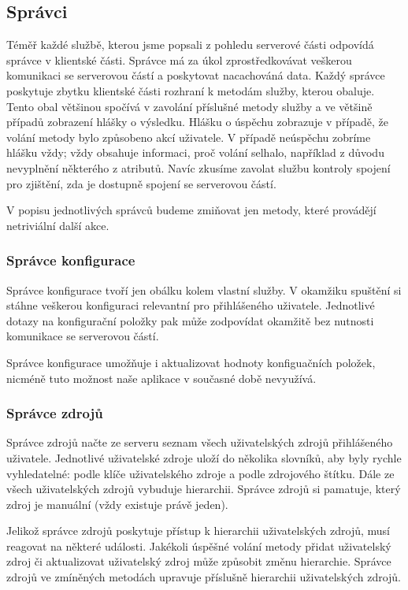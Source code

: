 \subsection{Správci}

Téměř každé službě, kterou jsme popsali z pohledu serverové části odpovídá správce v klientské části.
Správce má za úkol zprostředkovávat veškerou komunikaci se serverovou částí a poskytovat nacachováná data.
Každý správce poskytuje zbytku klientské části rozhraní k metodám služby, kterou obaluje.
Tento obal většinou spočívá v zavolání příslušné metody služby a ve většině případů zobrazení hlášky o výsledku.
Hlášku o úspěchu zobrazuje v případě, že volání metody bylo způsobeno akcí uživatele.
V případě neúspěchu zobríme hlášku vždy; vždy obsahuje informaci, proč volání selhalo, například z důvodu nevyplnění některého z atributů.
Navíc zkusíme zavolat službu kontroly spojení pro zjištění, zda je dostupně spojení se serverovou částí.

V popisu jednotlivých správců budeme zmiňovat jen metody, které provádějí netriviální další akce.

\subsubsection{Správce konfigurace}

Správce konfigurace tvoří jen obálku kolem vlastní služby.
V okamžiku spuštění si stáhne veškerou konfiguraci relevantní pro přihlášeného uživatele.
Jednotlivé dotazy na konfigurační položky pak může zodpovídat okamžitě bez nutnosti komunikace se serverovou částí.

Správce konfigurace umožňuje i aktualizovat hodnoty konfiguačních položek, nicméně tuto možnost naše aplikace v současné době nevyužívá.

\subsubsection{Správce zdrojů}

Správce zdrojů načte ze serveru seznam všech uživatelských zdrojů přihlášeného uživatele.
Jednotlivé uživatelské zdroje uloží do několika slovníků, aby byly rychle vyhledatelné: podle klíče uživatelského zdroje a podle zdrojového štítku.
Dále ze všech uživatelských zdrojů vybuduje hierarchii.
Správce zdrojů si pamatuje, který zdroj je manuální (vždy existuje právě jeden).

Jelikož správce zdrojů poskytuje přístup k hierarchii uživatelských zdrojů, musí reagovat na některé události.
Jakékoli úspěšné volání metody přidat uživatelský zdroj či aktualizovat uživatelský zdroj může způsobit změnu hierarchie.
Správce zdrojů ve zmíněných metodách upravuje příslušně hierarchii uživatelských zdrojů.

